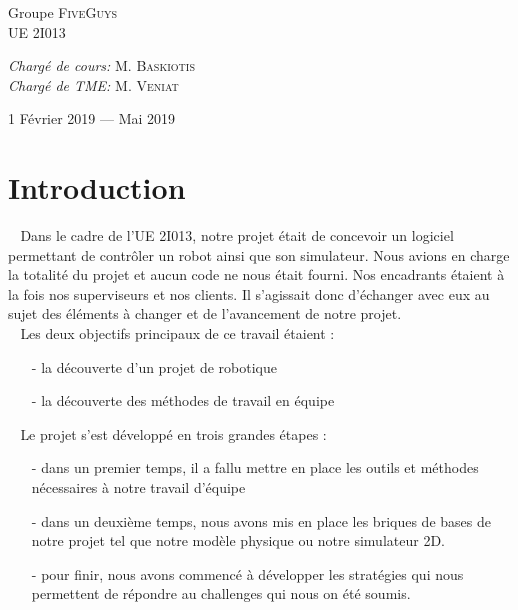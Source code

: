 \documentclass[12pt]{article}
\def\tab{$\>\>\>\>$}
\begin{document}
\begin{titlepage}
\begin{sffamily}
\begin{center}
    \begin{minipage}{0.4\textwidth}
      \begin{flushleft} \large
        Groupe \textsc{FiveGuys}\\
        UE 2I013\\
      \end{flushleft}
    \end{minipage}
    \begin{minipage}{0.4\textwidth}
      \begin{flushright} \large
        \emph{Chargé de cours:} M. \textsc{Baskiotis}\\
        \emph{Chargé de TME:} M. \textsc{Veniat}
      \end{flushright}
    \end{minipage}

    \vfill

    {\large 1\ier{} Février 2019 — Mai 2019}

  \end{center}
  \end{sffamily}
\end{titlepage}

\tableofcontents
\newpage

\section{Introduction}

\tab Dans le cadre de l'UE 2I013, notre projet était de concevoir un logiciel permettant de contrôler un robot ainsi que son simulateur. Nous avions en charge la totalité du projet et aucun code ne nous était fourni. Nos encadrants étaient à la fois nos superviseurs et nos clients. Il s'agissait donc d'échanger avec eux au sujet des éléments à changer et de l'avancement de notre projet.\\

\tab Les deux objectifs principaux de ce travail étaient : \begin{itemize}
\item[-] la découverte d'un projet de robotique
\item[-] la découverte des méthodes de travail en équipe
\item[]
\end{itemize}

\tab Le projet s'est développé en trois grandes étapes :\begin{itemize}
\item[-] dans un premier temps, il a fallu mettre en place les outils et méthodes nécessaires à notre travail d'équipe
\item[-] dans un deuxième temps, nous avons mis en place les briques de bases de notre projet tel que notre modèle physique ou notre simulateur 2D.
\item[-] pour finir, nous avons commencé à développer les stratégies qui nous permettent de répondre au challenges qui nous on été soumis.
\end{itemize}
\end{document}

